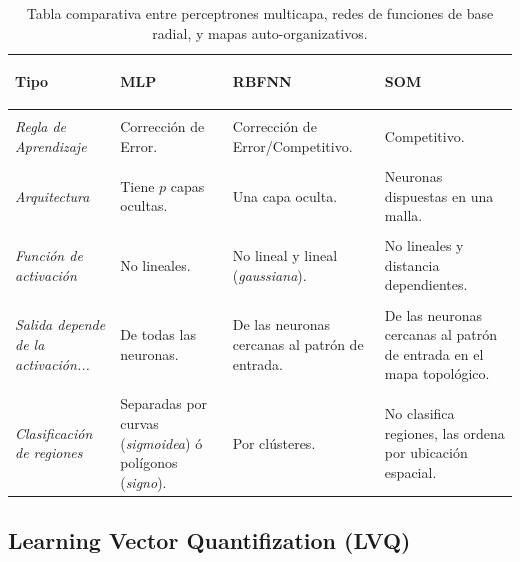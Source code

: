\documentclass[10pt,a4paper]{article}
\begin{document}
\begin{table}[h]
\centering
\begin{tabular}{ >{\columncolor{light-gray}}p{} p{} p{} p{}  }
\hline 
\rowcolor{white}
\begin{center} \textbf{Tipo} \end{center} & 
\begin{center} \textbf{MLP} \end{center} & 
\begin{center} \textbf{RBFNN} \end{center}& 
\begin{center} \textbf{SOM} \end{center} 
\\ \hline \\ [-1.5ex]
\textit{Regla de Aprendizaje}&
Corrección de Error. &
Corrección de Error/Competitivo. &
Competitivo. 
\\ [3.5ex] \hline \\ [-1.5ex]
\textit{Arquitectura}&
Tiene $p$ capas ocultas. &
Una capa oculta. &
Neuronas dispuestas en una malla. 
\\ [1ex] \hline \\ [-1.5ex]
\textit{Función de activación} &
No lineales. &
No lineal y lineal (\textit{gaussiana}). &
No lineales y distancia dependientes. 
\\ [1ex] \hline \\ [-1.5ex]
\textit{Salida depende de la activación...} &
De todas las neuronas. &
De las neuronas cercanas al patrón de entrada. &
De las neuronas cercanas al patrón de entrada en el mapa topológico. 
\\ [1ex] \hline \\ [-1.5ex]
\textit{Clasificación de regiones} &
Separadas por curvas (\textit{sigmoidea}) ó polígonos (\textit{signo}). &
Por clústeres. &
No clasifica regiones, las ordena por ubicación espacial. 
\\ [1ex] \hline 
\end{tabular}
\caption{Tabla comparativa entre perceptrones multicapa, redes de funciones de base radial, y mapas auto-organizativos.}
\label{tab:comparativo}
\end{table}



\subsection{Learning Vector Quantifization (LVQ)}
\end{document}
